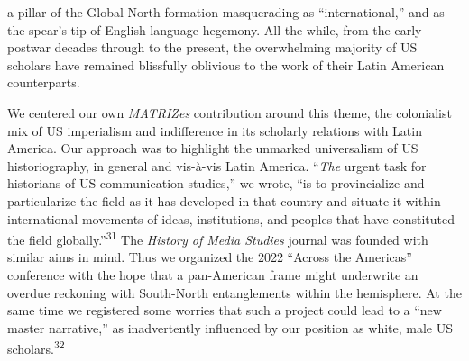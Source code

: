 \documentclass{tufte-handout}
\begin{document}
a pillar of the Global North formation masquerading as
``international,'' and as the spear's tip of English-language hegemony.
All the while, from the early postwar decades through to the present,
the overwhelming majority of US scholars have remained blissfully
oblivious to the work of their Latin American counterparts.

We centered our own \emph{MATRIZes} contribution around this theme, the
colonialist mix of US imperialism and indifference in its scholarly
relations with Latin America. Our approach was to highlight the unmarked
universalism of US historiography, in general and vis-à-vis Latin
America. ``\emph{The} urgent task for historians of US communication
studies,'' we wrote, ``is to provincialize and particularize the field
as it has developed in that country and situate it within international
movements of ideas, institutions, and peoples that have constituted the
field globally.''\textsuperscript{31} The
\emph{History of Media Studies} journal was founded with similar aims in
mind. Thus we organized the 2022 ``Across the Americas'' conference with
the hope that a pan-American frame might underwrite an overdue reckoning
with South-North entanglements within the hemisphere. At the same time
we registered some worries that such a project could lead to a ``new
master narrative,'' as inadvertently influenced by our position as
white, male US scholars.\textsuperscript{32}
\end{document}

